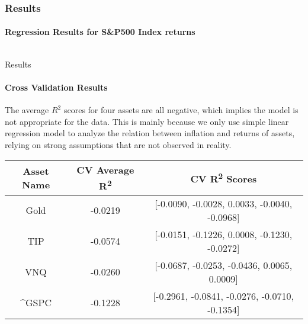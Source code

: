 \documentclass{beamer}
\begin{document}
\begin{frame}
  \frametitle{Results}
  \framesubtitle{Regression Results for S\&P500 Index returns}
    \vspace{-7.5pt}
  \begin{center}
    \begin{tabular}{c}
     
    \end{tabular}
  \end{center}
\end{frame}

\begin{frame}[fragile]{Results}
\framesubtitle{Cross Validation Results}

The average \(R^2\) scores for four assets are all negative, which implies the model is not appropriate for the data. This is mainly because we only use simple linear regression model to analyze the relation between inflation and returns of assets, relying on strong assumptions that are not observed in reality.

\begin{table}[h!]
  \centering
  \begin{tabular}{|c|c|c|}
    \hline
    \textbf{Asset Name}  &  \textbf{CV Average R\textsuperscript{2}} & \textbf{CV R\textsuperscript{2} Scores} \\
    \hline
    Gold & -0.0219 & [-0.0090, -0.0028, 0.0033, -0.0040, -0.0968] \\
    \hline
    TIP & -0.0574 & [-0.0151, -0.1226, 0.0008, -0.1230, -0.0272] \\
    \hline
    VNQ & -0.0260 & [-0.0687, -0.0253, -0.0436, 0.0065, 0.0009] \\
    \hline
    \textasciicircum GSPC & -0.1228 & [-0.2961, -0.0841, -0.0276, -0.0710, -0.1354] \\
    \hline
  \end{tabular}

  \label{tab:table1}
\end{table}
  
\end{frame}

  
\end{document}
